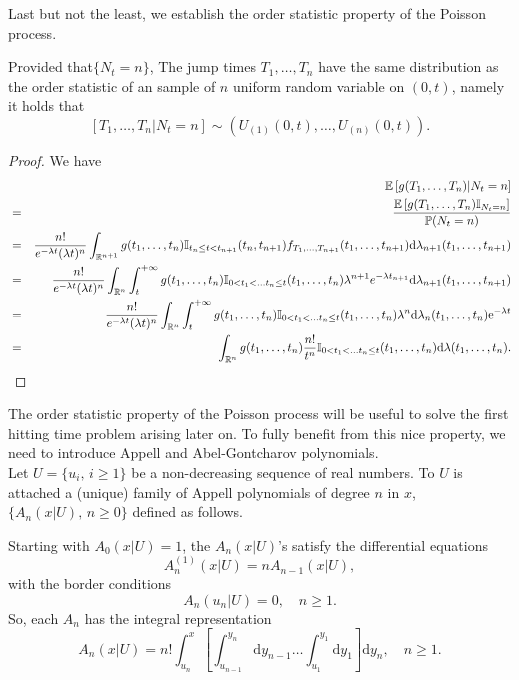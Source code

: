 Last but not the least, we establish the order statistic property of the Poisson process.
\begin{prop}
Provided that$\{N_t=n\}$, The jump times $T_1,\ldots,T_n$ have the same distribution as the order statistic of an \iid sample of $n$ uniform random variable on $(0,t)$, namely it holds that
$$
[T_1,\ldots,T_n|N_t=n]\sim \left(U_{(1)}(0,t),\ldots, U_{(n)}(0,t)\right).
$$
\end{prop}
\begin{proof}
We have
\begin{eqnarray*}
&&\mathbb{E}\left[g(T_1,\ldots, T_n)|N_t = n\right]\\
&=&\frac{\mathbb{E}\left[g(T_1,\ldots, T_n)\mathbb{I}_{N_t = n}\right]}{\mathbb{P}(N_t = n)}\\
&=&\frac{n!}{e^{-\lambda t}(\lambda t)^n}\int_{\mathbb{R}^{n+1}}g(t_1,\ldots, t_n)\mathbb{I}_{t_n\leq t<t_{n+1}}(t_n,t_{n+1})f_{T_1,\ldots, T_{n+1}}(t_1,\ldots, t_{n+1})\text{d}\lambda_{n+1}(t_1,\ldots, t_{n+1})\\
&=&\frac{n!}{e^{-\lambda t}(\lambda t)^n}\int_{\mathbb{R}^{n}}\int_{t}^{+\infty}g(t_1,\ldots, t_n)\mathbb{I}_{0<t_1<\ldots t_n\leq t}(t_1,\ldots,t_{n})\lambda^{n+1} e^{-\lambda t_{n+1}}\text{d}\lambda_{n+1}(t_1,\ldots, t_{n+1})\\
&=&\frac{n!}{e^{-\lambda t}(\lambda t)^n}\int_{\mathbb{R}^{n}}\int_{t}^{+\infty}g(t_1,\ldots, t_n)\mathbb{I}_{0<t_1<\ldots t_n\leq t}(t_1,\ldots,t_{n})\lambda^{n} \text{d}\lambda_{n}(t_1,\ldots,t_n)\mathrm{e}^{-\lambda t}\\
 &=&\int_{\mathbb{R}^{n}}g(t_1,\ldots, t_n)\frac{n!}{t^n}\mathbb{I}_{0<t_1<\ldots t_n\leq t}(t_1,\ldots,t_{n})\text{d}\lambda(t_1,\ldots,t_{n} ).
\end{eqnarray*}
\end{proof}
\noindent The order statistic property of the Poisson process will be useful to solve the first hitting time problem arising later on. To fully benefit from this nice property, we need to introduce Appell and Abel-Gontcharov polynomials.\\

\noindent Let $U=\{u_i, \, i\geq 1\}$ be a non-decreasing sequence of real numbers. To $U$ is attached a (unique) family of Appell polynomials of degree $n$ in $x$, $\{A_{n}(x\vert U),\, n\geq 0\}$ defined as follows.
\begin{definition} 
Starting with $A_0(x\vert U)=1$, the $A_n(x\vert U)$'s satisfy the differential equations
\begin{equation}\label{eq:DifferentialEquationAppellPolynomial}
A_{n}^{(1)}(x|U)=nA_{n-1}(x|U),  
\end{equation}
with the border conditions
\begin{equation}\label{eq:Border AppellPolynomial}
A_{n}(u_{n}|U)=0, \quad n\geq 1.
\end{equation}
So, each $A_n$ has the integral representation
\begin{equation}\label{eq:IntegralRepresentationAppellPolynomials}
A_{n}(x|U)=n!\int_{u_{n}}^{x}\left[\int_{u_{n-1}}^{y_{n}}\text{d}y_{n-1} \ldots \int_{u_{1}}^{y_{1}}\text{d}y_{1}\right]\text{d}y_{n}, \quad n\geq 1.
\end{equation}
\end{definition}

